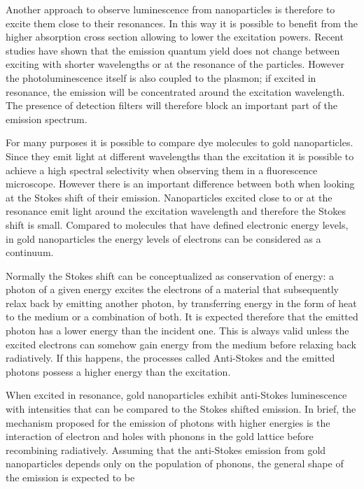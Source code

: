 Another approach to observe luminescence from nanoparticles is therefore to
excite them close to their resonances. In this way it is possible to benefit
from the higher absorption cross section allowing to lower the excitation
powers. Recent studies have shown that the emission quantum yield does not
change between exciting with shorter wavelengths or at the resonance of the
particles\cite{Cheng2015}. However the photoluminescence itself is also coupled
to the plasmon; if excited in resonance, the emission will be concentrated
around the excitation wavelength\cite{Sundararaman2014}. The presence of
detection filters will therefore block an important part of the emission
spectrum.

For many purposes it is possible to compare dye molecules to gold nanoparticles.
Since they emit light at different wavelengths than the excitation it is
possible to achieve a high spectral selectivity when observing them in a
fluorescence microscope. However there is an important difference between both
when looking at the Stokes shift of their emission. Nanoparticles excited close
to or at the resonance emit light around the excitation wavelength and therefore
the Stokes shift is small. Compared to molecules that have defined electronic
energy levels, in gold nanoparticles the energy levels of electrons can be
considered as a continuum. 

Normally the Stokes shift can be conceptualized as conservation of energy: a
photon of a given energy excites the electrons of a material that subsequently
relax back by emitting another photon, by transferring energy in the form of
heat to the medium or a combination of both. It is expected therefore that the
emitted photon has a lower energy than the incident one. This is always valid
unless the excited electrons can somehow gain energy from the medium before
relaxing back radiatively. If this happens, the processes called Anti-Stokes
and the emitted photons possess a higher energy than the excitation.

When excited in resonance, gold nanoparticles exhibit anti-Stokes luminescence
with intensities that can be compared to the Stokes shifted emission. In brief,
the mechanism proposed for the emission of photons with higher energies is the
interaction of electron and holes with phonons in the gold lattice before
recombining radiatively. Assuming that the anti-Stokes emission from gold
nanoparticles depends only on the population of phonons, the general shape of
the emission is expected to be

